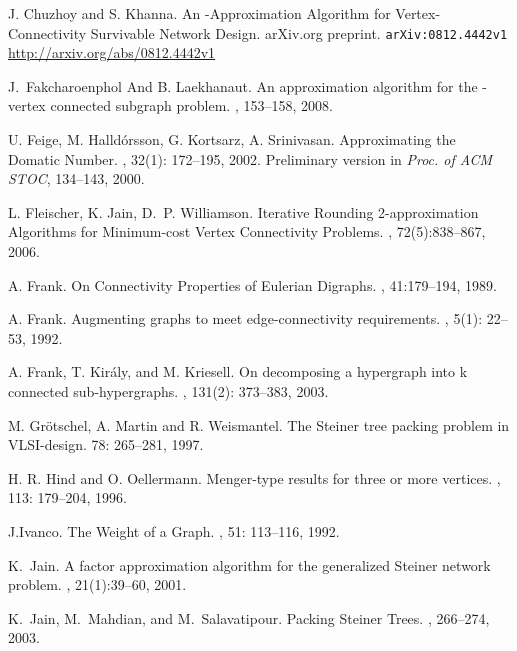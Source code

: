 \documentclass[11pt]{article}
\begin{document}
\begin{thebibliography}{55}
J. Chuzhoy and S. Khanna.
\newblock An -Approximation Algorithm for
Vertex-Connectivity Survivable Network Design.
\newblock arXiv.org preprint. {\tt arXiv:0812.4442v1}
\url{http://arxiv.org/abs/0812.4442v1}

J.~Fakcharoenphol And B. Laekhanaut.
\newblock An  approximation algorithm for the
-vertex connected subgraph problem.
, 153--158, 2008. 

U. Feige, M. Halld\'{o}rsson, G. Kortsarz, A. Srinivasan.
\newblock Approximating the Domatic Number.
, 32(1): 172--195, 2002.
\newblock Preliminary version in {\em Proc. of ACM STOC}, 134--143, 2000.

L. Fleischer, K. Jain, D.~P. Williamson.
\newblock Iterative Rounding 2-approximation Algorithms for Minimum-cost Vertex
Connectivity Problems.
, 72(5):838--867, 2006.

A. Frank.
\newblock On Connectivity Properties of Eulerian Digraphs.
, 41:179--194, 1989.

A. Frank.
\newblock Augmenting graphs to meet edge-connectivity requirements.
, 5(1): 22--53, 1992.

A. Frank, T. Kir\'{a}ly, and M. Kriesell.
\newblock On decomposing a hypergraph into k connected sub-hypergraphs. 
, 131(2): 373--383, 2003. 


M. Gr\"{o}tschel, A. Martin and R. Weismantel.
\newblock The Steiner tree packing problem in VLSI-design.
 78: 265--281, 1997.

H. R. Hind and O. Oellermann.
\newblock Menger-type results for three or more vertices.
, 113: 179--204, 1996.

J.Ivanco.
\newblock The Weight of a Graph.
, 51: 113--116, 1992.

K.~Jain.
\newblock A factor  approximation algorithm for the generalized Steiner 
  network problem.
, 21(1):39--60, 
  2001.

K.~Jain, M.~Mahdian, and M.~Salavatipour.
\newblock Packing Steiner Trees.
, 266--274, 2003.


\end{thebibliography}
\end{document}
